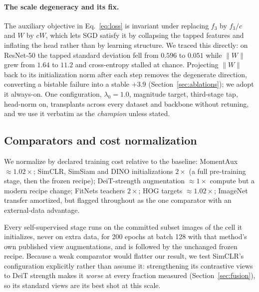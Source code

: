 \paragraph{The scale degeneracy and its fix.} The auxiliary objective in
Eq.~\ref{eq:loss} is invariant under replacing $f_3$ by $f_3/c$ and $W$ by $cW$,
which lets SGD satisfy it by collapsing the tapped features and inflating
the head rather than by learning structure. We traced this directly:
on ResNet-50 the tapped standard deviation fell from $0.596$ to $0.051$ while
$\lVert W\rVert$ grew from $1.64$ to $11.2$ and cross-entropy stalled at
chance. Projecting $\lVert W \rVert$ back to its initialization norm after
each step removes the degenerate direction, converting a bistable failure
into a stable $+3.9$ (Section~\ref{sec:ablations}); we adopt it always-on.
One configuration, $\lambda_0{=}1.0$, magnitude target, third-stage tap,
head-norm on, transplants across every dataset and backbone without
retuning, and we use it verbatim as the \emph{champion} unless stated.

\subsection{Comparators and cost normalization}\label{sec:comparators}
We normalize by declared training cost relative to the baseline:
MomentAux ${\approx}1.02\times$; SimCLR, SimSiam and DINO initializations
$2\times$ (a full pre-training stage, then the frozen recipe);
DeiT-strength augmentation \citep{touvron2021deit} ${\approx}1\times$
compute but a modern recipe change; FitNets teachers $2\times$; HOG
targets ${\approx}1.02\times$; ImageNet transfer amortized, but flagged
throughout as the one comparator with an external-data advantage.

Every self-supervised stage runs on the committed subset images of the
cell it initializes, never on extra data, for 200 epochs at batch
128 with that method's own published view augmentations, and is followed
by the unchanged frozen recipe. Because a weak comparator would flatter
our result, we test SimCLR's configuration explicitly rather than assume
it: strengthening its contrastive views to DeiT strength makes it
\emph{worse} at every fraction measured (Section~\ref{sec:fusion}), so
its standard views are its best shot at this scale.

